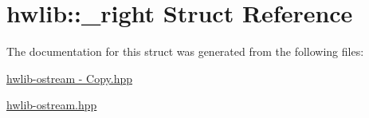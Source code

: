 \hypertarget{structhwlib_1_1__right}{}\section{hwlib\+:\+:\+\_\+right Struct Reference}
\label{structhwlib_1_1__right}


The documentation for this struct was generated from the following files\+:\begin{DoxyCompactItemize}
\item 
\hyperlink{hwlib-ostream_01-_01_copy_8hpp}{hwlib-\/ostream -\/ Copy.\+hpp}\item 
\hyperlink{hwlib-ostream_8hpp}{hwlib-\/ostream.\+hpp}\end{DoxyCompactItemize}
